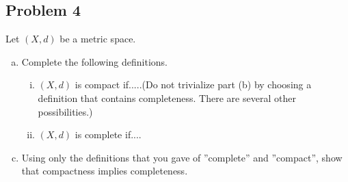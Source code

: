 \documentclass[12pt]{article}
\theoremstyle{definition}
\begin{document}
\subsection{Problem 4}
Let $(X,d)$ be a metric space.
\begin{enumerate}[label={[\arabic*]}]
    \item 
    \begin{enumerate}[(a)]
        \item Complete the following definitions.
        \begin{enumerate}[(i)]
            \item $(X,d)$ is compact if.....(Do not trivialize part (b) by choosing a definition that contains completeness. There are several other possibilities.)
            \item $(X,d)$ is complete if....
        \end{enumerate}
    \end{enumerate}
    \item 
    \begin{enumerate}[(a)]
        \setcounter{enumi}{2}
        \item Using only the definitions that you gave of ''complete'' and ''compact'', show that compactness implies completeness.
    \end{enumerate}
\end{enumerate}
\end{document}
